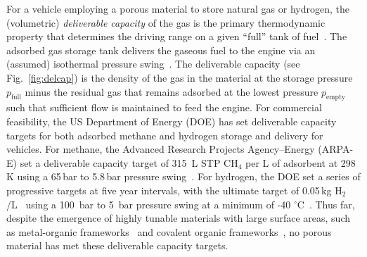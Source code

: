 \documentclass[pre,twocolumn]{revtex4-2}
\newcommand\pfull{\ensuremath{p_{\text{full}}}}
\newcommand\pempty{\ensuremath{p_{\text{empty}}}}
\begin{document}
For a vehicle employing a porous material to store natural gas or hydrogen, the
(volumetric) \emph{deliverable capacity} of the gas is the primary
thermodynamic property that determines the driving
range on a given ``full'' tank of fuel~\cite{mason2014evaluating}. 
The adsorbed gas storage tank delivers the
gaseous fuel to the engine via an (assumed) isothermal pressure
swing~\cite{sircar2002pressure}. The deliverable capacity (see
Fig.~\ref{fig:delcap}) is the density of the gas in the material at the storage
pressure $\pfull$ minus the residual gas that remains adsorbed at the lowest
pressure $\pempty$ such that sufficient flow is maintained to feed the engine.
For commercial feasibility, the US Department of Energy (DOE) has set
deliverable capacity targets for both adsorbed methane and hydrogen storage and
delivery for vehicles. For methane, the Advanced Research Projects
Agency--Energy (ARPA-E) set a deliverable capacity target of 315\ L STP CH$_4$
per L of adsorbent at 298 K using a 65\,bar to 5.8\,bar pressure
swing~\cite{simon2015materials}. For hydrogen, the DOE set a series of
progressive targets at five year intervals, with the ultimate target of 0.05\,kg
H$_2$/L~\cite{h2targetsDOE} using a 100\ bar to 5\ bar pressure swing at a
minimum of -40 $^\circ$C~\cite{allendorf2018assessment}. Thus far, despite the
emergence of highly tunable materials with large surface areas, such as
metal-organic frameworks~\cite{furukawa2013chemistry} and covalent organic 
frameworks~\cite{diercks2017atom}, no porous material has met these deliverable capacity targets.


\end{document}
